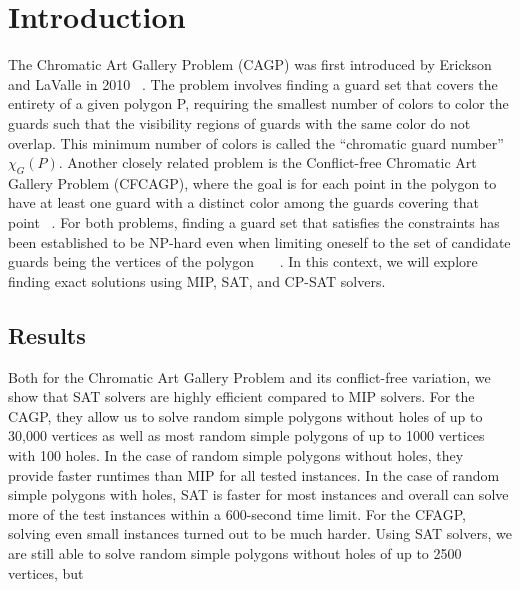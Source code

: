 \chapter{Introduction}
The Chromatic Art Gallery Problem (CAGP) was first introduced by Erickson and LaValle in 2010 ~\cite{erickson2010chromatic}. The problem involves finding a guard set that covers the entirety of a given polygon P, requiring the smallest number of colors to color the guards such that the visibility regions of guards with the same color do not overlap. This minimum number of colors is called the ``chromatic guard number'' $\chi_G(P)$. Another closely related problem is the Conflict-free Chromatic Art Gallery Problem (CFCAGP), where the goal is for each point in the polygon to have at least one guard with a distinct color among the guards covering that point ~\cite{bartschi2014conflict}. For both problems, finding a guard set that satisfies the constraints has been established to be NP-hard even when limiting oneself to the set of candidate guards being the vertices of the polygon ~\cite{fekete2014chromatic}~\cite{erickson2011many}~\cite{iwamoto2022vertex}. In this context, we will explore finding exact solutions using MIP, SAT, and CP-SAT solvers.

\section{Results}
Both for the Chromatic Art Gallery Problem and its conflict-free variation, we show that SAT solvers are highly efficient compared to MIP solvers. For the CAGP, they allow us to solve random simple polygons without holes of up to 30,000 vertices as well as most random simple polygons of up to 1000 vertices with 100 holes. In the case of random simple polygons without holes, they provide faster runtimes than MIP for all tested instances. In the case of random simple polygons with holes, SAT is faster for most instances and overall can solve more of the test instances within a 600-second time limit.
For the CFAGP, solving even small instances turned out to be much harder. Using SAT solvers, we are still able to solve random simple polygons without holes of up to 2500 vertices, but 

